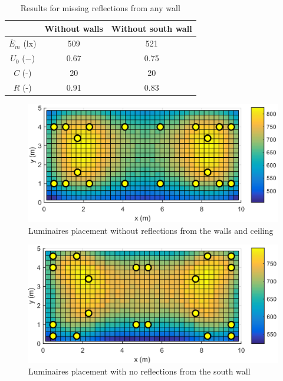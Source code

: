 \begin{table}[tb]
	\renewcommand{\arraystretch}{1.3}
	\caption{Results for missing reflections from any wall}
 	\label{tab:noRef}
	\centering
  \begin{tabular}{| c | c | c |}
    \hline
    & \textbf{Without walls} & \textbf{Without south wall} \\
    \hline
    $\overline{E}_{m}$ (lx) & 509 & 521 \\
    \hline
		$U_0$ ($-$)& 0.67 & 0.75 \\
    \hline
		$C$ (-) & 20 & 20 \\
	\hline
		$R$ (-) & 0.91 & 0.83 \\
  \hline
  \end{tabular}
\end{table}
\begin{figure}[tb]
  \centering
  \includegraphics[width=\columnwidth]{../Vysledky/MSTR_SLB_4x18W_5G4_Fit2_NoRef_V010_S1}
  \caption{Luminaires placement without reflections from the walls and ceiling}
  \label{fig:V010_S1_NoRef}
\end{figure}
\begin{figure}[tb]
  \centering
  \includegraphics[width=\columnwidth]{../Vysledky/MSTR_SLB_4x18W_5G4_Fit2_NoSWall_V010_S1}
  \caption{Luminaires placement with no reflections from the south wall}
  \label{fig:V010_S1_NoSWall}
\end{figure}